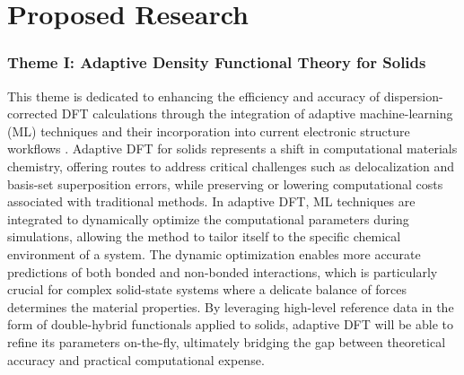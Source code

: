 \documentclass[11pt,english,calcwidth,compact]{nserc-appendix}
\begin{document}
%
%
%
\section{Proposed Research}

\subsubsection*{Theme I: Adaptive Density Functional Theory for Solids}

This theme is dedicated to enhancing the efficiency and accuracy of dispersion-corrected DFT calculations through the integration of adaptive machine-learning (ML) techniques and their incorporation into current electronic structure workflows \cite{apbe0}. Adaptive DFT for solids represents a shift in computational materials chemistry, offering routes to address critical challenges such as delocalization and basis-set superposition errors, while preserving or lowering computational costs associated with traditional methods. In adaptive DFT, ML techniques are integrated to dynamically optimize the computational parameters during simulations, allowing the method to tailor itself to the specific chemical environment of a system. The dynamic optimization enables more accurate predictions of both bonded and non-bonded interactions, which is particularly crucial for complex solid-state systems where a delicate balance of forces determines the material properties. By leveraging high-level reference data in the form of double-hybrid functionals applied to solids,  adaptive DFT will be able to refine its parameters on-the-fly, ultimately bridging the gap between theoretical accuracy and practical computational expense.  
\end{document}

